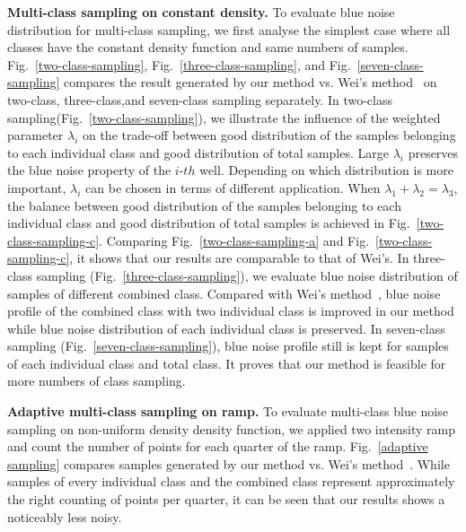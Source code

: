 \textbf{Multi-class sampling on constant density.}
To evaluate blue noise distribution for multi-class sampling,
we first analyse the simplest case where all classes have the constant density function and same numbers of samples.
Fig.~\ref{two-class-sampling}, Fig.~\ref{three-class-sampling},
and Fig.~\ref{seven-class-sampling} compares the result generated by our method vs. Wei's method~\cite{wei:2010:multi} on two-class, three-class,and seven-class sampling separately.
In two-class sampling(Fig.~\ref{two-class-sampling}),
we illustrate the influence of the weighted parameter $\lambda_i$ on the trade-off between good distribution of the samples belonging to each individual class and good distribution of total samples.
Large $\lambda_i$ preserves the blue noise property of the $i$-$th$ well.
Depending on which distribution is more important,
$\lambda_i$ can be chosen in terms of different application.
When $\lambda_1+\lambda_2=\lambda_3$,
the balance between good distribution of the samples belonging to each individual class and good distribution of total samples
is achieved in Fig.~\ref{two-class-sampling-c}.
Comparing Fig.~\ref{two-class-sampling-a} and Fig.~\ref{two-class-sampling-c},
it shows that our results are comparable to that of Wei's.
In three-class sampling (Fig.~\ref{three-class-sampling}),
we evaluate blue noise distribution of samples of different combined class.
Compared with Wei's method~\cite{wei:2010:multi},
 blue noise profile of the combined class with two individual class is improved in our method
while blue noise distribution of each individual class is preserved.
In seven-class sampling (Fig.~\ref{seven-class-sampling}),
blue noise profile still is kept for samples of each individual class and total class.
It proves that our method is feasible for more numbers of class sampling.


\textbf{Adaptive multi-class sampling on ramp.}
To evaluate multi-class blue noise sampling on non-uniform density density function,
we applied two intensity ramp and count the number of points for each quarter of the ramp.
Fig.~\ref{adaptive sampling} compares samples generated by
our method vs. Wei's method~\cite{wei:2010:multi}.
While samples of every individual class and the combined class represent approximately the right counting of points per quarter,
it can be seen that our results shows a noticeably less noisy.

